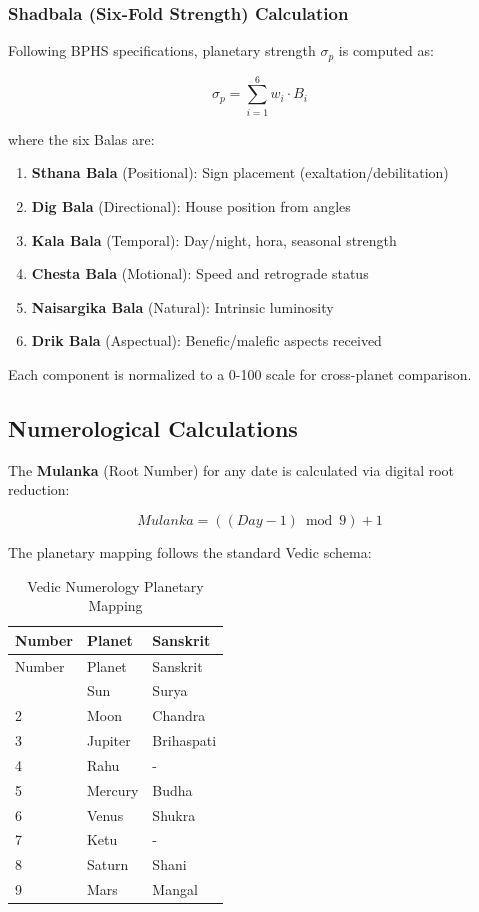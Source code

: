 \documentclass[
  11pt,
  a4paper,
  oneside,
  openany]{article}
\providecommand{\tightlist}{%
  \setlength{\itemsep}{0pt}\setlength{\parskip}{0pt}}\usepackage{longtable,booktabs,array}
\begin{document}
\subsubsection{Shadbala (Six-Fold Strength)
Calculation}\label{shadbala-six-fold-strength-calculation}

Following BPHS specifications, planetary strength \(\sigma_p\) is
computed as:

\[
\sigma_p = \sum_{i=1}^{6} w_i \cdot B_i
\]

where the six Balas are:

\begin{enumerate}
\def\labelenumi{\arabic{enumi}.}
\tightlist
\item
  \textbf{Sthana Bala} (Positional): Sign placement
  (exaltation/debilitation)
\item
  \textbf{Dig Bala} (Directional): House position from angles
\item
  \textbf{Kala Bala} (Temporal): Day/night, hora, seasonal strength
\item
  \textbf{Chesta Bala} (Motional): Speed and retrograde status
\item
  \textbf{Naisargika Bala} (Natural): Intrinsic luminosity
\item
  \textbf{Drik Bala} (Aspectual): Benefic/malefic aspects received
\end{enumerate}

Each component is normalized to a 0-100 scale for cross-planet
comparison.

\subsection{Numerological
Calculations}\label{numerological-calculations}

The \textbf{Mulanka} (Root Number) for any date is calculated via
digital root reduction:

\[
Mulanka = ((Day - 1) \bmod 9) + 1
\]

The planetary mapping follows the standard Vedic schema:

\begin{longtable}[]{@{}lll@{}}
\caption{Vedic Numerology Planetary
Mapping}\label{tbl-numerology}\tabularnewline
\toprule\noalign{}
Number & Planet & Sanskrit \\
\midrule\noalign{}
\endfirsthead
\toprule\noalign{}
Number & Planet & Sanskrit \\
\midrule\noalign{}
\endhead
\bottomrule\noalign{}
\endlastfoot
1 & Sun & Surya \\
2 & Moon & Chandra \\
3 & Jupiter & Brihaspati \\
4 & Rahu & - \\
5 & Mercury & Budha \\
6 & Venus & Shukra \\
7 & Ketu & - \\
8 & Saturn & Shani \\
9 & Mars & Mangal \\
\end{longtable}
\end{document}
